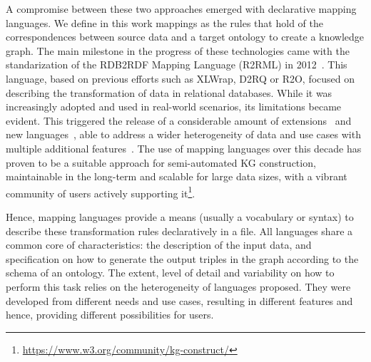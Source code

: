 
A compromise between these two approaches emerged with declarative mapping languages. We define in this work mappings as the rules that hold of the correspondences between source data and a target ontology to create a knowledge graph. The main milestone in the progress of these technologies came with the standarization of the RDB2RDF Mapping Language (R2RML) in 2012~\citep{das2012r2rml}. This language, based on previous efforts such as XLWrap, D2RQ or R2O, focused on describing the transformation of data in relational databases. While it was increasingly adopted and used in real-world scenarios, its limitations became evident. This triggered the release of a considerable amount of extensions~\citep{} and new languages~\citep{}, able to address a wider heterogeneity of data and use cases with multiple additional features~\citep{}.  The use of mapping languages over this decade has proven to be a suitable approach for semi-automated KG construction, maintainable in the long-term and scalable for large data sizes, with a vibrant community of users actively supporting it\footnote{\url{https://www.w3.org/community/kg-construct/}}. 


 Hence, mapping languages provide a means (usually a vocabulary or syntax) to describe these transformation rules declaratively in a file. All languages share a common core of characteristics: the description of the input data, and specification on how to generate the output triples in the graph according to the schema of an ontology. The extent, level of detail and variability on how to perform this task relies on the heterogeneity of languages proposed. They were developed from different needs and use cases, resulting in different features and hence, providing different possibilities for users.  


